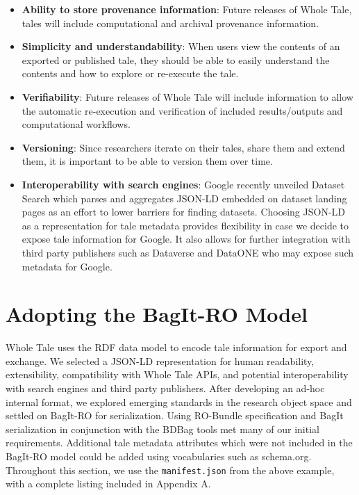 \documentclass[conference]{IEEEtran}
\begin{document}
\begin{itemize}
\item{{\bf Ability to store provenance information}: Future releases of Whole Tale, tales will include computational and archival provenance information.}
\item{{\bf Simplicity and understandability}: When users view the contents of an exported or published tale, they should be able to easily understand the contents and how to explore or re-execute the tale.}
\item{{\bf Verifiability}: Future releases of Whole Tale will include information to allow the automatic re-execution and verification of included results/outputs and computational workflows.}
\item{{\bf Versioning}: Since researchers iterate on their tales, share them and extend them, it is important to be able to version them over time.}
\item{{\bf Interoperability with search engines}: Google recently unveiled Dataset Search which parses and aggregates JSON-LD embedded on dataset landing pages as an effort to lower barriers for finding datasets. Choosing JSON-LD as a representation for tale metadata provides flexibility in case we decide to expose tale information for Google. It also allows for further integration with third party publishers such as Dataverse and DataONE who may expose such metadata for Google.}
\end{itemize}

\section{Adopting the BagIt-RO Model} \label{adopting}

Whole Tale uses the RDF data model to encode tale information for export and exchange. We selected  a JSON-LD representation for human readability, extensibility, compatibility with Whole Tale APIs, and potential interoperability with search engines and third party publishers. After developing an  ad-hoc internal format, we explored emerging standards in the research object space and settled on BagIt-RO for serialization. Using RO-Bundle specification and BagIt serialization in conjunction with the BDBag tools met many of our initial requirements. Additional tale metadata attributes which were not included in the BagIt-RO model could be added using vocabularies such as schema.org. Throughout this section, we use the \texttt{manifest.json} from the above example, with a complete listing included in Appendix A.
\end{document}

